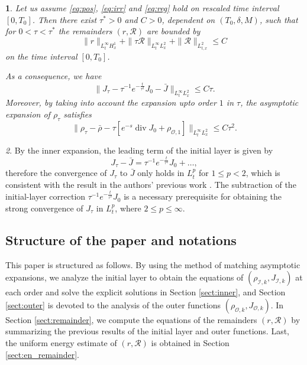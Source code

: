\documentclass[english]{amsart}
\theoremstyle{plain}
\newtheorem{thm}{\protect\theoremname}
\theoremstyle{definition}
\theoremstyle{remark}
\newtheorem{rem}[thm]{\protect\remarkname}
\theoremstyle{plain}
\theoremstyle{plain}
\theoremstyle{plain}
\providecommand{\remarkname}{Remark}
\providecommand{\theoremname}{Theorem}
\DeclareMathOperator{\diver}{div}
\numberwithin{equation}{section}
\begin{document}
\begin{thm}\label{thm:main}
Let us assume \eqref{eq:pos}, \eqref{eq:irr} and \eqref{eq:reg} hold on rescaled time interval $[0,T_0]$. Then there exist $\tau^*>0$ and $C>0$, dependent on $(T_0,\delta,M)$, such that for $0<\tau<\tau^*$ the remainders $(r,\mathcal{R})$ are bounded by
\begin{equation}\label{eq:main_r}
\|r\|_{L^\infty_tH^1_x}+\|\tau\mathcal{R}\|_{L^\infty_tL^2_x}+\|\mathcal{R}\|_{L^2_{t,x}}\leq C
\end{equation}
on the time interval $[0,T_0]$.

As a consequence, we have
\begin{equation}\label{eq:main_J}
\|J_\tau-\tau^{-1}e^{-\frac{t}{\tau^2}}J_0-\bar J\|_{L^\infty_tL^2_x}\leq C\tau.
\end{equation}
Moreover, by taking into account the expansion upto order $1$ in $\tau$, the asymptotic expansion of $\rho_\tau$ satisfies
\begin{equation}\label{eq:main_rho}
\|\rho_\tau-\bar\rho-\tau [e^{-s}\diver J_0+\rho_{\mathcal{O},1}]\|_{L^\infty_tL^2_{x}}\leq C\tau^2.
\end{equation}
\end{thm}

\begin{rem}
By the inner expansion, the leading term of the initial layer is given by
\[
J_\tau-\bar J=\tau^{-1}e^{-\frac{t}{\tau^2}}J_0+\dots,
\]
therefore the convergence of $J_\tau$ to $\bar J$ only holds in $L^p_t$ for $1\leq p<2$, which is consistent with the result in the authors' previous work \cite{AMZ3}. The subtraction of the initial-layer correction $\tau^{-1}e^{-\frac{t}{\tau^2}}J_0$ is a necessary prerequisite for obtaining the strong convergence of $J_\tau$ in $L^p_t$, where $2\le p\leq\infty$. 
\end{rem}

\subsection{Structure of the paper and notations}

This paper is structured as follows. By using the method of matching asymptotic expansions, we analyze the initial layer to obtain the equations of $(\rho_{\mathcal{I},k},J_{\mathcal{I},k})$ at each order and solve the explicit solutions in Section \ref{sect:inner}, and Section \ref{sect:outer} is devoted to the analysis of the outer functions $(\rho_{\mathcal{O},k},J_{\mathcal{O},k})$. In Section \ref{sect:remainder}, we compute the equations of the remainders $(r,\mathcal{R})$ by summarizing the previous results of the initial layer and outer functions. Last, the uniform energy estimate of $(r,\mathcal{R})$ is obtained in Section \ref{sect:en_remainder}.
\end{document}
